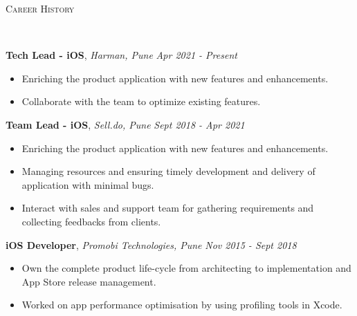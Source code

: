 \documentclass[9pt]{article}
\newenvironment{changemargin}[2]{%
  \begin{list}{}{%
    \setlength{\topsep}{0pt}%
    \setlength{\leftmargin}{#1}%
    \setlength{\rightmargin}{#2}%
    \setlength{\listparindent}{\parindent}%
    \setlength{\itemindent}{\parindent}%
    \setlength{\parsep}{\parskip}%
  }%
  \item[]}{\end{list}
}
\newcommand{\lineover}{
    \begin{changemargin}{-0.05in}{-0.05in}
        \vspace*{-8pt}
        \hrulefill \\
        \vspace*{-2pt}
    \end{changemargin}
}
\newcommand{\header}[1]{
    \begin{changemargin}{-0.5in}{-0.5in}
        \scshape{#1}\\
    \lineover
    \end{changemargin}
}
\newenvironment{body} {
    \vspace*{-16pt}
    \begin{changemargin}{-0.25in}{-0.5in}
  }
    {\end{changemargin}
}
\begin{document}
\header{Career History}

\begin{body}
    \vspace{14pt}
    \textbf{Tech Lead - iOS}, \emph{Harman, Pune} \hfill \emph{Apr 2021 - Present}\\
    \begin{itemize} \itemsep -0pt  %
        \item Enriching the product application with new features and enhancements.
    \end{itemize}
    \begin{itemize} \itemsep -0pt  %
        \item Collaborate with the team to optimize existing features.
    \end{itemize}
    
    \vspace{14pt}
    \textbf{Team Lead - iOS}, \emph{Sell.do, Pune} \hfill \emph{Sept 2018 - Apr 2021}\\
    \begin{itemize} \itemsep -0pt  %
        \item Enriching the product application with new features and enhancements.
    \end{itemize}
    \begin{itemize} \itemsep -0pt  %
        \item Managing resources and ensuring timely development and delivery of application with minimal bugs.
    \end{itemize}
    \begin{itemize} \itemsep -0pt  %
        \item Interact with sales and support team for gathering requirements and collecting feedbacks from clients.
    \end{itemize}
    \vspace*{-4pt}

    \vspace{14pt}
    \textbf{iOS Developer}, \emph{Promobi Technologies, Pune} \hfill \emph{Nov 2015 - Sept 2018}\\
    \begin{itemize} \itemsep -0pt  %
        \item Own the complete product life-cycle from architecting to implementation and App Store release management.
    \end{itemize}
    \begin{itemize} \itemsep -0pt  %
        \item Worked on app performance optimisation by using profiling tools in Xcode.
    \end{itemize}
    \vspace*{-4pt}


\end{body}
\end{document}
